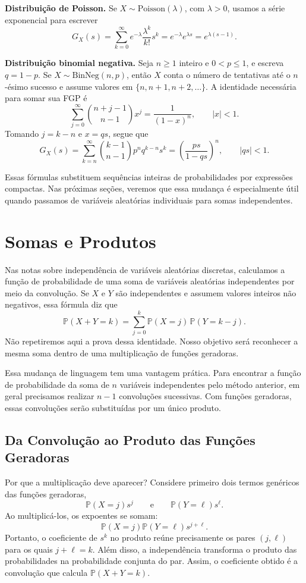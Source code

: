 \documentclass[12pt,portuguese]{article}
\theoremstyle{definition}
\theoremstyle{plainexercise}
\theoremstyle{starredexercise}
\theoremstyle{definition}
\begin{document}
\medskip
\noindent\textbf{Distribuição de Poisson.}
Se $X\sim\mathrm{Poisson}(\lambda)$, com $\lambda>0$, usamos a série
exponencial para escrever
\[
G_X(s)
=\sum_{k=0}^{\infty}e^{-\lambda}\frac{\lambda^k}{k!}s^k
=e^{-\lambda}e^{\lambda s}
=e^{\lambda(s-1)}.
\]

\medskip
\noindent\textbf{Distribuição binomial negativa.}
Seja $n\geqslant1$ inteiro e $0<p\leqslant1$, e escreva $q=1-p$. Se
$X\sim\mathrm{BinNeg}(n,p)$, então $X$ conta o número de tentativas até o
$n$-ésimo sucesso e assume valores em $\{n,n+1,n+2,\ldots\}$. A identidade
necessária para somar sua FGP é
\[
\sum_{j=0}^{\infty}\binom{n+j-1}{n-1}x^j
=\frac{1}{(1-x)^n},
\qquad |x|<1.
\]
Tomando $j=k-n$ e $x=qs$, segue que
\[
G_X(s)
=\sum_{k=n}^{\infty}\binom{k-1}{n-1}p^nq^{k-n}s^k
=\left(\frac{ps}{1-qs}\right)^n,
\qquad |qs|<1.
\]

Essas fórmulas substituem sequências inteiras de probabilidades por expressões
compactas. Nas próximas seções, veremos que essa mudança é especialmente útil
quando passamos de variáveis aleatórias individuais para somas independentes.

\section{Somas e Produtos}\label{sec:somas-independentes-fgp}

Nas notas sobre independência de variáveis aleatórias discretas,
calculamos a função de probabilidade de uma soma de variáveis aleatórias
independentes por meio da convolução.
Se $X$ e $Y$ são independentes e assumem valores inteiros não negativos,
essa fórmula diz que
\[
\mathbb{P}(X+Y=k)
=
\sum_{j=0}^{k}
\mathbb{P}(X=j)\,\mathbb{P}(Y=k-j).
\]
Não repetiremos aqui a prova dessa identidade.
Nosso objetivo será reconhecer a mesma soma dentro de uma multiplicação
de funções geradoras.

Essa mudança de linguagem tem uma vantagem prática.
Para encontrar a função de probabilidade da soma de $n$ variáveis
independentes pelo método anterior,
em geral precisamos realizar $n-1$ convoluções sucessivas.
Com funções geradoras, essas convoluções serão substituídas por um único
produto.

\subsection{Da Convolução ao Produto das Funções Geradoras}\label{sec:fgp-produto}

Por que a multiplicação deve aparecer?
Considere primeiro dois termos genéricos das funções geradoras,
\[
\mathbb{P}(X=j)s^j
\qquad\text{e}\qquad
\mathbb{P}(Y=\ell)s^\ell.
\]
Ao multiplicá-los, os expoentes se somam:
\[
\mathbb{P}(X=j)\mathbb{P}(Y=\ell)s^{j+\ell}.
\]
Portanto, o coeficiente de $s^k$ no produto reúne precisamente os pares
$(j,\ell)$ para os quais $j+\ell=k$.
Além disso, a independência transforma o produto das probabilidades na
probabilidade conjunta do par.
Assim, o coeficiente obtido é a convolução que calcula
$\mathbb{P}(X+Y=k)$.
\end{document}
